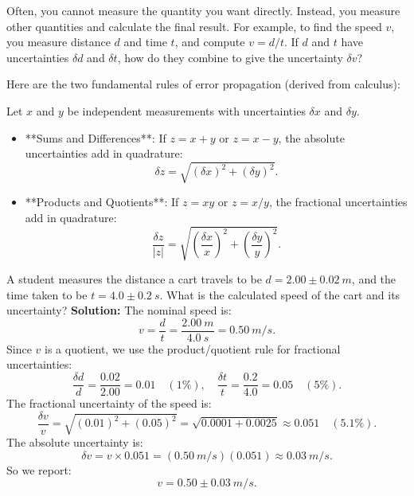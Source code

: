 Often, you cannot measure the quantity you want directly. Instead, you measure other quantities and calculate the final result. For example, to find the speed $v$, you measure distance $d$ and time $t$, and compute $v = d/t$. If $d$ and $t$ have uncertainties $\delta d$ and $\delta t$, how do they combine to give the uncertainty $\delta v$?

Here are the two fundamental rules of error propagation (derived from calculus):

\begin{keybox}
Let $x$ and $y$ be independent measurements with uncertainties $\delta x$ and $\delta y$.
\begin{itemize}
  \item **Sums and Differences**: If $z = x + y$ or $z = x - y$, the absolute uncertainties add in quadrature:
        \begin{equation}
            \delta z = \sqrt{(\delta x)^2 + (\delta y)^2}.
        \end{equation}
  \item **Products and Quotients**: If $z = x y$ or $z = x / y$, the fractional uncertainties add in quadrature:
        \begin{equation}
            \frac{\delta z}{|z|} = \sqrt{\left(\frac{\delta x}{x}\right)^2 + \left(\frac{\delta y}{y}\right)^2}.
        \end{equation}
\end{itemize}
\end{keybox}

\begin{workedexample}
A student measures the distance a cart travels to be $d = 2.00 \pm \SI{0.02}{m}$, and the time taken to be $t = 4.0 \pm \SI{0.2}{s}$. What is the calculated speed of the cart and its uncertainty?
\newline
\textbf{Solution:}
The nominal speed is:
\begin{equation*}
    v = \frac{d}{t} = \frac{\SI{2.00}{m}}{\SI{4.0}{s}} = \SI{0.50}{m/s}.
\end{equation*}
Since $v$ is a quotient, we use the product/quotient rule for fractional uncertainties:
\begin{equation*}
    \frac{\delta d}{d} = \frac{0.02}{2.00} = 0.01 \quad (1\%), \quad \frac{\delta t}{t} = \frac{0.2}{4.0} = 0.05 \quad (5\%).
\end{equation*}
The fractional uncertainty of the speed is:
\begin{equation*}
    \frac{\delta v}{v} = \sqrt{(0.01)^2 + (0.05)^2} = \sqrt{0.0001 + 0.0025} \approx 0.051 \quad (5.1\%).
\end{equation*}
The absolute uncertainty is:
\begin{equation*}
    \delta v = v \times 0.051 = (\SI{0.50}{m/s})(0.051) \approx \SI{0.03}{m/s}.
\end{equation*}
So we report:
\begin{equation*}
    v = 0.50 \pm \SI{0.03}{m/s}.
\end{equation*}
\end{workedexample}

